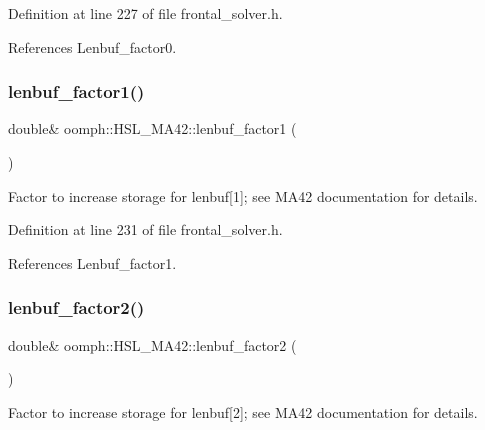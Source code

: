 Definition at line 227 of file frontal\+\_\+solver.\+h.



References Lenbuf\+\_\+factor0.

\mbox{\label{classoomph_1_1HSL__MA42_a6223b48d49fe262c95e2766ed6f4d2cd}} 
\subsubsection{\texorpdfstring{lenbuf\+\_\+factor1()}{lenbuf\_factor1()}}
{\footnotesize\ttfamily double\& oomph\+::\+H\+S\+L\+\_\+\+M\+A42\+::lenbuf\+\_\+factor1 (\begin{DoxyParamCaption}{ }\end{DoxyParamCaption})\hspace{0.3cm}{\ttfamily [inline]}}



Factor to increase storage for lenbuf\mbox{[}1\mbox{]}; see M\+A42 documentation for details. 



Definition at line 231 of file frontal\+\_\+solver.\+h.



References Lenbuf\+\_\+factor1.

\mbox{\label{classoomph_1_1HSL__MA42_af60a52ae246af72f38882bf77c324c13}} 
\subsubsection{\texorpdfstring{lenbuf\+\_\+factor2()}{lenbuf\_factor2()}}
{\footnotesize\ttfamily double\& oomph\+::\+H\+S\+L\+\_\+\+M\+A42\+::lenbuf\+\_\+factor2 (\begin{DoxyParamCaption}{ }\end{DoxyParamCaption})\hspace{0.3cm}{\ttfamily [inline]}}



Factor to increase storage for lenbuf\mbox{[}2\mbox{]}; see M\+A42 documentation for details. 



